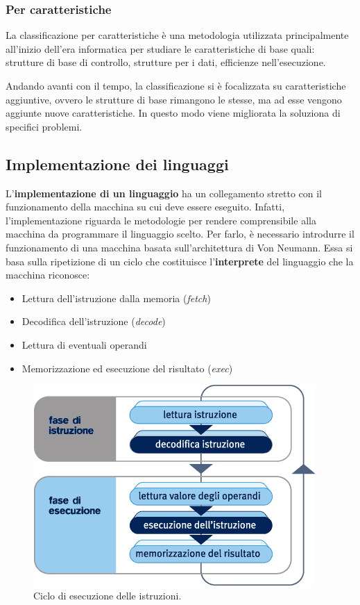 \documentclass[a4paper]{article}
\begin{document}
	\subsubsection{Per caratteristiche}
	
	La classificazione per caratteristiche è una metodologia utilizzata principalmente all'inizio dell'era informatica per studiare le caratteristiche di base quali: strutture di base di controllo, strutture per i dati, efficienze nell'esecuzione.\newline
	
	\noindent
	Andando avanti con il tempo, la classificazione si è focalizzata su caratteristiche aggiuntive, ovvero le strutture di base rimangono le stesse, ma ad esse vengono aggiunte nuove caratteristiche. In questo modo viene migliorata la soluziona di specifici problemi.\newpage
	
	\subsection{Implementazione dei linguaggi}
	
	L'\textbf{implementazione di un linguaggio} ha un collegamento stretto con il funzionamento della macchina su cui deve essere eseguito. Infatti, l'implementazione riguarda le metodologie per rendere comprensibile alla macchina da programmare il linguaggio scelto. Per farlo, è necessario introdurre il funzionamento di una macchina basata sull'architettura di Von Neumann. Essa si basa sulla ripetizione di un ciclo che costituisce l'\textbf{interprete} del linguaggio che la macchina riconosce:
	\begin{itemize}
		\item Lettura dell'istruzione dalla memoria (\emph{fetch})
		
		\item Decodifica dell'istruzione (\emph{decode})
		
		\item Lettura di eventuali operandi
		
		\item Memorizzazione ed esecuzione del risultato (\emph{exec})
	\end{itemize}
	\begin{figure}[!htp]
		\centering
		\includegraphics[width=.75\textwidth]{img/fasi_esecuzione.png}
		\caption{Ciclo di esecuzione delle istruzioni.}
	\end{figure}
\end{document}
